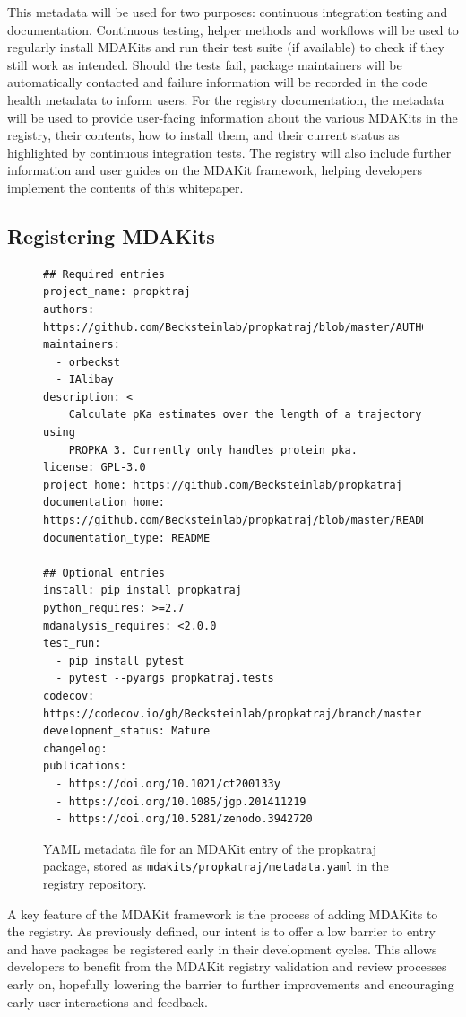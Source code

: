 \documentclass{article}
\begin{document}
This metadata will be used for two purposes: continuous integration testing and documentation. Continuous testing, helper methods and workflows will be used to regularly install MDAKits and run their test suite (if available) to check if they still work as intended. Should the tests fail, package maintainers will be automatically contacted and failure information will be recorded in the code health metadata to inform users. For the registry documentation, the metadata will be used to provide user-facing information about the various MDAKits in the registry, their contents, how to install them, and their current status as highlighted by continuous integration tests. The registry will also include further information and user guides on the MDAKit framework, helping developers implement the contents of this whitepaper.

\subsection{Registering MDAKits}

\begin{figure}
    \centering
    \begin{verbatim}
## Required entries
project_name: propktraj
authors: https://github.com/Becksteinlab/propkatraj/blob/master/AUTHORS
maintainers:
  - orbeckst
  - IAlibay
description: <
    Calculate pKa estimates over the length of a trajectory using
    PROPKA 3. Currently only handles protein pka.
license: GPL-3.0
project_home: https://github.com/Becksteinlab/propkatraj
documentation_home: https://github.com/Becksteinlab/propkatraj/blob/master/README.md
documentation_type: README

## Optional entries
install: pip install propkatraj
python_requires: >=2.7
mdanalysis_requires: <2.0.0
test_run: 
  - pip install pytest
  - pytest --pyargs propkatraj.tests
codecov: https://codecov.io/gh/Becksteinlab/propkatraj/branch/master
development_status: Mature
changelog: 
publications:
  - https://doi.org/10.1021/ct200133y
  - https://doi.org/10.1085/jgp.201411219
  - https://doi.org/10.5281/zenodo.3942720
    \end{verbatim}
    \caption{YAML metadata file for an MDAKit entry of the propkatraj package, stored as \texttt{mdakits/propkatraj/metadata.yaml} in the registry repository.}
    \label{fig:metadatapropkatraj}
\end{figure}

A key feature of the MDAKit framework is the process of adding MDAKits to the registry. As previously defined, our intent is to offer a low barrier to entry and have packages be registered early in their development cycles. This allows developers to benefit from the MDAKit registry validation and review processes early on, hopefully lowering the barrier to further improvements and encouraging early user interactions and feedback.
 
\end{document}
